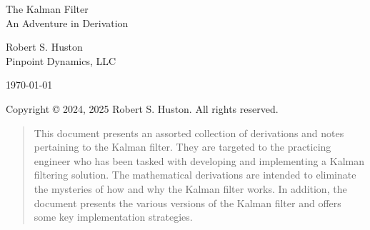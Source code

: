 \documentclass[12pt]{article}
\begin{document}



\setlength{\parskip}{12pt}      %
\setlength{\tabcolsep}{12pt}    %
\hfuzz=60pt                     %



\newenvironment{myitemize}
{ \begin{itemize}
    \setlength{\itemsep}{0pt}
    \setlength{\parskip}{0pt}
    \setlength{\parsep}{0pt}     }
{ \end{itemize}                  } 



\newtheorem{theorem}{Theorem}[section]
\newtheorem{lemma}[theorem]{Lemma}



\begin{titlepage}
    \begin{center}
        \vspace*{\fill}
        
        \huge
        The Kalman Filter \\
        
        \large
        An Adventure in Derivation
        
        \vspace{24pt}
        
        \large
        Robert S. Huston \\
        Pinpoint Dynamics, LLC \\
        
        \vspace{24pt}
        
        \today
        
        \vspace{24pt}
        
        \large
        Copyright © 2024, 2025 Robert S. Huston. All rights reserved.
        
        \vfill
    \end{center}
\end{titlepage}



\begin{abstract}
This document presents an assorted collection of derivations and notes pertaining to the
Kalman filter. They are targeted to the practicing engineer who has been tasked with
developing and implementing a Kalman filtering solution. The mathematical derivations are
intended to eliminate the mysteries of how and why the Kalman filter works. In addition,
the document presents the various versions of the Kalman filter and offers some key
implementation strategies.
\end{abstract}
\end{document}

